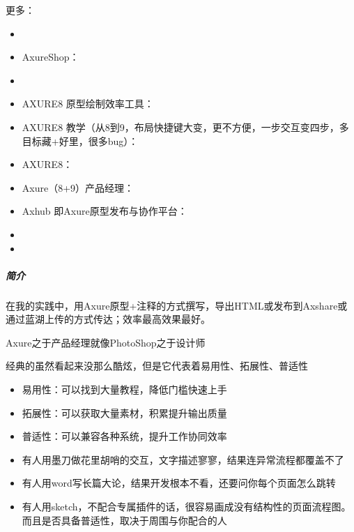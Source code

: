 \documentclass[letterpaper,10pt,english]{sphinxmanual}
\begin{document}
更多：
\begin{itemize}
\item {} 

\item {} 
AxureShop：

\item {} 

\item {} 
AXURE8
原型绘制效率工具：

\item {} 
AXURE8
教学（从8到9，布局快捷键大变，更不方便，一步交互变四步，多目标藏+好里，很多bug）：

\item {} 
AXURE8：

\item {} 
Axure（8+9）产品经理：

\item {} 
Axhub 即Axure原型发布与协作平台：

\item {} 

\item {} 

\end{itemize}


\subparagraph{简介}
\label{\detokenize{chapter_knowledge/tools:id2}}

在我的实践中，用Axure原型+注释的方式撰写，导出HTML或发布到Axshare或通过蓝湖上传的方式传达；效率最高效果最好。

Axure之于产品经理就像PhotoShop之于设计师

经典的虽然看起来没那么酷炫，但是它代表着易用性、拓展性、普适性
\begin{itemize}
\item {} 
易用性：可以找到大量教程，降低门槛快速上手

\item {} 
拓展性：可以获取大量素材，积累提升输出质量

\item {} 
普适性：可以兼容各种系统，提升工作协同效率

\item {} 
有人用墨刀做花里胡哨的交互，文字描述寥寥，结果连异常流程都覆盖不了

\item {} 
有人用word写长篇大论，结果开发根本不看，还要问你每个页面怎么跳转

\item {} 
有人用sketch，不配合专属插件的话，很容易画成没有结构性的页面流程图。而且是否具备普适性，取决于周围与你配合的人

\end{itemize}
\end{document}
